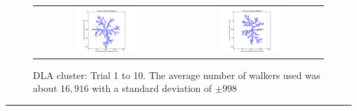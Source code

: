 \documentclass[a4paper,12pt]{article}
\begin{document}
\begin{figure}[H]
\vspace*{-0.3cm}
\centering
	\begin{tabular}{@{}cc@{}}
                \includegraphics[width = 0.45\textwidth]{pics/DLA_crystal_final_9.pdf} &
                \includegraphics[width = 0.45\textwidth]{pics/DLA_crystal_final_10.pdf} \\
        \end{tabular}
        \caption{DLA cluster: Trial 1 to 10. The average number of walkers used was about $16,916$ with a standard deviation of $\pm 998$}
        \label{DLAcluster}
\end{figure}
\vspace*{-0.8cm}
\rule{13.5cm}{0.4pt}
\end{document}
